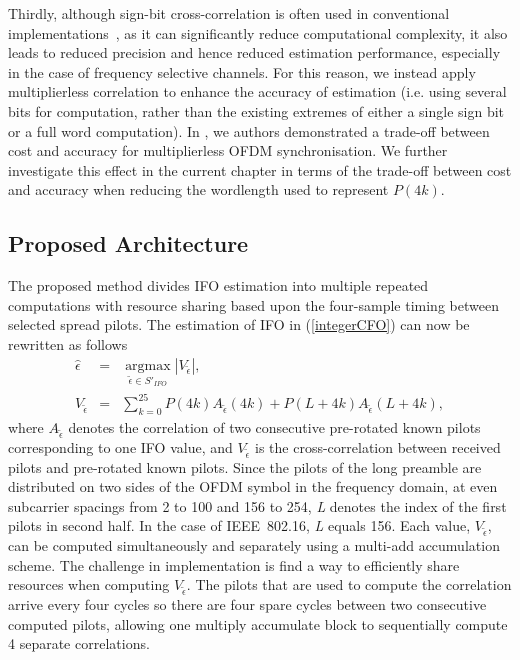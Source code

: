 Thirdly, although sign-bit cross-correlation is often used in conventional implementations~\cite{Kim2008,Schwoerer2002}, as it can significantly reduce computational complexity, it also leads to reduced precision and hence reduced estimation performance, especially in the case of frequency selective channels.
For this reason, we instead apply multiplierless correlation to enhance the accuracy of estimation (i.e. using several bits for computation, rather than the existing extremes of either a single sign bit or a full word computation).
In \cite{Pham2012}, we authors demonstrated a trade-off between cost and accuracy for multiplierless OFDM synchronisation.
We further investigate this effect in the current chapter in terms of the trade-off between cost and accuracy when reducing the wordlength used to represent $P(4k)$.

\subsection{Proposed Architecture}
\label{subsec:Imple}
The proposed method divides IFO estimation into multiple repeated computations with resource sharing based upon the four-sample timing between selected spread pilots.
The estimation of IFO in (\ref{integerCFO}) can now be rewritten as follows
\begin{eqnarray}
\label{proposedimplementIFO}
\hat{\epsilon}  &=&\underset{\tilde{\epsilon} \in S'_{IFO}}{\operatorname{argmax}}  \left|V_{\tilde{\epsilon}}  \right|,	 \nonumber \\
V_{\tilde{\epsilon}} &=& \sum_{k=0}^{25} P(4k) A_{\tilde{\epsilon}}(4k) + P(L+4k)  A_{\tilde{\epsilon}}(L+4k),
\end{eqnarray}
where $A_{\tilde{\epsilon}}$ denotes the correlation of two consecutive pre-rotated known pilots corresponding to one IFO value, and $V_{\tilde{\epsilon}}$ is the cross-correlation between received pilots and pre-rotated known pilots.
Since the pilots of the long preamble are distributed on two sides of the OFDM symbol in the frequency domain, at even subcarrier spacings from 2 to 100 and 156 to 254, \emph{L} denotes the index of the first pilots in second half.
In the case of IEEE~802.16, \emph{L} equals 156.
Each value, $V_{\tilde{\epsilon}}$, can be computed simultaneously and separately using a multi-add accumulation scheme.
The challenge in implementation is find a way to efficiently share resources when computing $V_{\tilde{\epsilon}}$.
The pilots that are used to compute the correlation arrive every four cycles so there are four spare cycles between two consecutive computed pilots, allowing one multiply accumulate block to sequentially compute 4 separate correlations.

